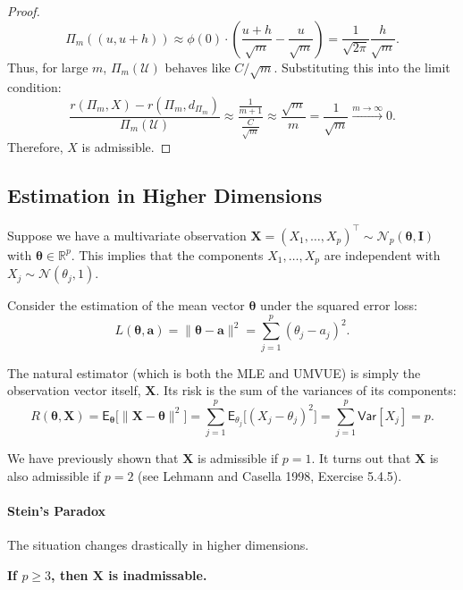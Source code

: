 \begin{proof}
\[ 
\Pi_m((u, u+h)) \approx \phi(0) \cdot \left( \frac{u+h}{\sqrt{m}} - \frac{u}{\sqrt{m}} \right) = \frac{1}{\sqrt{2\pi}} \frac{h}{\sqrt{m}}. 
\]
Thus, for large \(m\), \(\Pi_m(\mathcal{U})\) behaves like \(C/\sqrt{m}\).
Substituting this into the limit condition:
\[ 
\frac{r(\Pi_m, X) - r(\Pi_m, d_{\Pi_m})}{\Pi_m(\mathcal{U})} \approx \frac{\frac{1}{m+1}}{\frac{C}{\sqrt{m}}} \approx \frac{\sqrt{m}}{m} = \frac{1}{\sqrt{m}} \xrightarrow{m \to \infty} 0. 
\]
Therefore, \(X\) is admissible.
\end{proof}

\subsection{Estimation in Higher Dimensions}
\label{subsec:higher_dimensions}

Suppose we have a multivariate observation \(\mathbf{X} = (X_1, \dots, X_p)^{\top} \sim \mathcal{N}_p(\boldsymbol{\theta}, \mathbf{I})\) with \(\boldsymbol{\theta} \in \mathbb{R}^p\).
This implies that the components \(X_1, \dots, X_p\) are independent with \(X_j \sim \mathcal{N}(\theta_j, 1)\).

Consider the estimation of the mean vector \(\boldsymbol{\theta}\) under the squared error loss:
\[
L(\boldsymbol{\theta}, \mathbf{a}) = \|\boldsymbol{\theta} - \mathbf{a}\|^2 = \sum_{j=1}^{p} (\theta_j - a_j)^2.
\]

The natural estimator (which is both the MLE and UMVUE) is simply the observation vector itself, \(\mathbf{X}\). Its risk is the sum of the variances of its components:
\[
R(\boldsymbol{\theta}, \mathbf{X}) = \mathsf{E}_{\boldsymbol{\theta}} \big[ \| \mathbf{X} - \boldsymbol{\theta} \|^2 \big] = \sum_{j=1}^p \mathsf{E}_{\theta_j} \big[ (X_j - \theta_j)^2 \big] = \sum_{j=1}^p \mathsf{Var}[X_j] = p.
\]

We have previously shown that \(\mathbf{X}\) is admissible if \(p = 1\). It turns out that \(\mathbf{X}\) is also admissible if \(p = 2\) (see Lehmann and Casella 1998, Exercise 5.4.5).

\paragraph{Stein's Paradox}
The situation changes drastically in higher dimensions.
\begin{center}
    \textbf{If \(p \ge 3\), then \(\mathbf{X}\) is inadmissable.}
\end{center}

